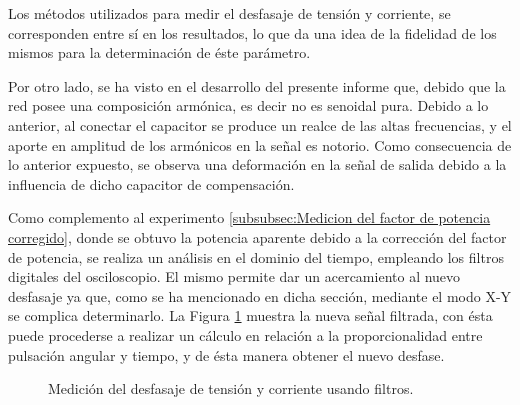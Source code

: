     Los métodos utilizados para medir el desfasaje de tensión y 
    corriente, se corresponden entre sí en los resultados, lo que da una idea de la fidelidad 
    de los mismos para la determinación de éste parámetro.

    Por otro lado, se ha visto en el desarrollo del presente informe que, debido que la red posee una composición 
    armónica, es decir no es senoidal pura. Debido a lo anterior, al conectar el capacitor se produce un realce de 
    las altas frecuencias, y el aporte en amplitud de los armónicos en la señal es 
    notorio. Como consecuencia de lo anterior expuesto, se observa una deformación en la señal de 
    salida debido a la influencia de dicho capacitor de compensación.

    Como complemento al experimento \ref{subsubsec:Medicion del factor de potencia corregido}, 
    donde se obtuvo la potencia aparente debido a la corrección del factor de potencia, se realiza un análisis en el 
    dominio del tiempo, empleando los filtros digitales del osciloscopio. El mismo permite dar un acercamiento 
    al nuevo desfasaje ya que, como se ha mencionado en dicha sección, mediante el modo X-Y se complica 
    determinarlo. La Figura \ref{fig: Desfasaje tensión-corriente.} muestra la nueva señal filtrada, 
    con ésta puede procederse a realizar un cálculo en relación a la proporcionalidad entre pulsación 
    angular y tiempo, y de ésta manera obtener el nuevo desfase.


        \begin{figure}[H]
          \centering
          \caption{Medición del desfasaje de tensión y corriente usando filtros.}
          \label{fig: Desfasaje tensión-corriente.}
        \end{figure}      

    


    

    
